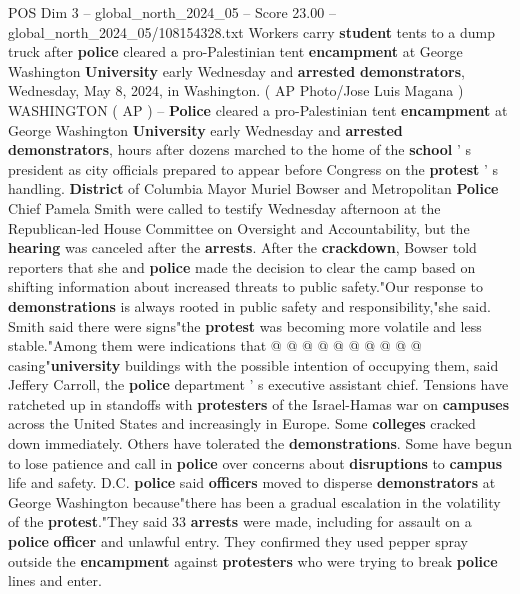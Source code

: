 \begin{textsample}{POS Dim 3 – global\_north\_2024\_05 – Score 23.00 – global\_north\_2024\_05/108154328.txt}  \label{ex:f3_pos_007}
Workers carry \textbf{student} tents to a dump truck after \textbf{police} cleared a pro-Palestinian tent \textbf{encampment} at George Washington \textbf{University} early Wednesday and \textbf{arrested} \textbf{demonstrators}, Wednesday, May 8, 2024, in Washington. ( AP Photo/Jose Luis Magana ) WASHINGTON ( AP ) -- \textbf{Police} cleared a pro-Palestinian tent \textbf{encampment} at George Washington \textbf{University} early Wednesday and \textbf{arrested} \textbf{demonstrators}, hours after dozens marched to the home of the \textbf{school} ' s president as city officials prepared to appear before Congress on the \textbf{protest} ' s handling. \textbf{District} of Columbia Mayor Muriel Bowser and Metropolitan \textbf{Police} Chief Pamela Smith were called to testify Wednesday afternoon at the Republican-led House Committee on Oversight and Accountability, but the \textbf{hearing} was canceled after the \textbf{arrests}.
After the \textbf{crackdown}, Bowser told reporters that she and \textbf{police} made the decision to clear the camp based on shifting information about increased threats to public safety."Our response to \textbf{demonstrations} is always rooted in public safety and responsibility,"she said.
Smith said there were signs"the \textbf{protest} was becoming more volatile and less stable."Among them were indications that @ @ @ @ @ @ @ @ @ @ casing"\textbf{university} buildings with the possible intention of occupying them, said Jeffery Carroll, the \textbf{police} department ' s executive assistant chief.
Tensions have ratcheted up in standoffs with \textbf{protesters} of the Israel-Hamas war on \textbf{campuses} across the United States and increasingly in Europe.
Some \textbf{colleges} cracked down immediately.
Others have tolerated the \textbf{demonstrations}.
Some have begun to lose patience and call in \textbf{police} over concerns about \textbf{disruptions} to \textbf{campus} life and safety.
D.C. \textbf{police} said \textbf{officers} moved to disperse \textbf{demonstrators} at George Washington because"there has been a gradual escalation in the volatility of the \textbf{protest}."They said 33 \textbf{arrests} were made, including for assault on a \textbf{police} \textbf{officer} and unlawful entry.
They confirmed they used pepper spray outside the \textbf{encampment} against \textbf{protesters} who were trying to break \textbf{police} lines and enter.

\end{textsample}
